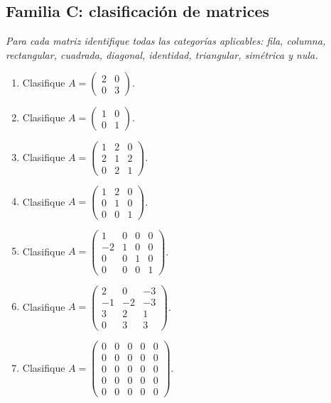 \documentclass[12pt]{article}
\theoremstyle{remark}
\newcounter{contadorEjercicio}
\newenvironment{listaejercicios}{\begin{enumerate}[label=\textbf{E\arabic*.},leftmargin=2.4em,itemsep=0.52em]\setcounter{enumi}{\value{contadorEjercicio}}}{\setcounter{contadorEjercicio}{\value{enumi}}\end{enumerate}}
\begin{document}
\subsection{Familia C: clasificación de matrices}\noindent\textit{Para cada matriz identifique todas las categorías aplicables: fila, columna, rectangular, cuadrada, diagonal, identidad, triangular, simétrica y nula.}\par\medskip
\begin{listaejercicios}

\item Clasifique $A=\begin{pmatrix}2&0\\0&3\end{pmatrix}$.

\item Clasifique $A=\begin{pmatrix}1&0\\0&1\end{pmatrix}$.

\item Clasifique $A=\begin{pmatrix}1&2&0\\2&1&2\\0&2&1\end{pmatrix}$.

\item Clasifique $A=\begin{pmatrix}1&2&0\\0&1&0\\0&0&1\end{pmatrix}$.

\item Clasifique $A=\begin{pmatrix}1&0&0&0\\-2&1&0&0\\0&0&1&0\\0&0&0&1\end{pmatrix}$.

\item Clasifique $A=\begin{pmatrix}2&0&-3\\-1&-2&-3\\3&2&1\\0&3&3\end{pmatrix}$.

\item Clasifique $A=\begin{pmatrix}0&0&0&0&0\\0&0&0&0&0\\0&0&0&0&0\\0&0&0&0&0\\0&0&0&0&0\end{pmatrix}$.


\end{listaejercicios}
\end{document}
